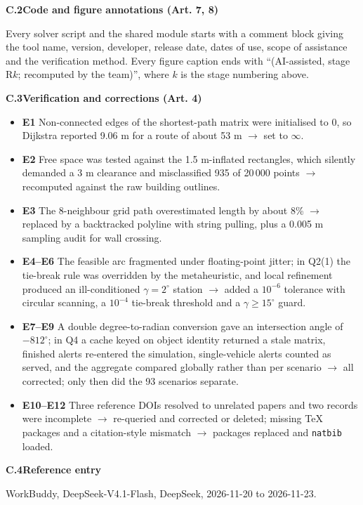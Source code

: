 \documentclass[12pt]{article}
\begin{document}
{\vspace{3pt}
\noindent\textbf{C.2\quad Code and figure annotations (Art. 7, 8)}

Every solver script and the shared module starts with a comment block giving the tool name, version, developer, release date, dates of use, scope of assistance and the verification method. Every figure caption ends with ``(AI-assisted, stage R$k$; recomputed by the team)'', where $k$ is the stage numbering above.

\vspace{3pt}
\noindent\textbf{C.3\quad Verification and corrections (Art. 4)}

\begin{itemize}[leftmargin=1.5em]
  \item \textbf{E1} Non-connected edges of the shortest-path matrix were initialised to $0$, so Dijkstra reported 9.06 m for a route of about 53 m $\rightarrow$ set to $\infty$.
  \item \textbf{E2} Free space was tested against the 1.5 m-inflated rectangles, which silently demanded a 3 m clearance and misclassified 935 of 20\,000 points $\rightarrow$ recomputed against the raw building outlines.
  \item \textbf{E3} The 8-neighbour grid path overestimated length by about 8\% $\rightarrow$ replaced by a backtracked polyline with string pulling, plus a 0.005 m sampling audit for wall crossing.
  \item \textbf{E4--E6} The feasible arc fragmented under floating-point jitter; in Q2(1) the tie-break rule was overridden by the metaheuristic, and local refinement produced an ill-conditioned $\gamma=2^\circ$ station $\rightarrow$ added a $10^{-6}$ tolerance with circular scanning, a $10^{-4}$ tie-break threshold and a $\gamma\ge15^\circ$ guard.
  \item \textbf{E7--E9} A double degree-to-radian conversion gave an intersection angle of $-812^\circ$; in Q4 a cache keyed on object identity returned a stale matrix, finished alerts re-entered the simulation, single-vehicle alerts counted as served, and the aggregate compared globally rather than per scenario $\rightarrow$ all corrected; only then did the 93 scenarios separate.
  \item \textbf{E10--E12} Three reference DOIs resolved to unrelated papers and two records were incomplete $\rightarrow$ re-queried and corrected or deleted; missing \TeX{} packages and a citation-style mismatch $\rightarrow$ packages replaced and \texttt{natbib} loaded.
\end{itemize}

\vspace{3pt}
\noindent\textbf{C.4\quad Reference entry}

\noindent [13] WorkBuddy, DeepSeek-V4.1-Flash, DeepSeek, 2026-11-20 to 2026-11-23.
\par}
\end{document}
